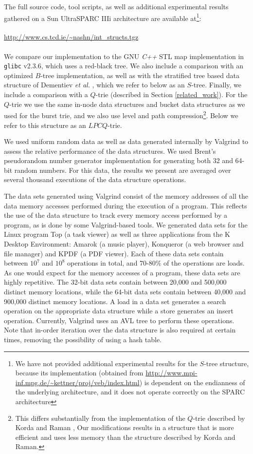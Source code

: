 \documentclass[]{acmtrans2m}
\begin{document}
The full source code, tool scripts, as well as additional experimental results
gathered on a Sun UltraSPARC IIIi architecture are available at\footnote{We have not provided additional
experimental results for the $S$-tree structure, because its implementation (obtained from
\url{http://www.mpi-inf.mpg.de/~kettner/proj/veb/index.html}) is dependent
on the endianness of the underlying architecture, and it does not operate correctly on the SPARC architecture}:\\
\\
\url{http://www.cs.tcd.ie/~nashn/int_structs.tgz}\\
\\
\noindent
We compare our implementation to the GNU \textsl{C++} STL map implementation \cite{Stroustrup97} in \texttt{glibc} v2.3.6, which uses a
red-black tree. We also include a comparison with an optimized $B$-tree implementation, as well as with the stratified tree based 
data structure of Dementiev \textit{et al.} \cite{Dementiev+04}, which we refer to below as an $S$-tree. 
Finally, we include a comparison with a $Q$-trie (described in Section \ref{related_work}). 
For the $Q$-trie we use the same in-node data structures and bucket data structures
as we used for the burst trie, and we also use level and path compression\footnote{This differs substantially from the implementation of the $Q$-trie described by Korda and Raman \cite{KordaRaman99},
Our modifications results in a structure that is more efficient and uses less memory than the structure described by Korda and Raman.}.
Below we refer to this structure as an $LPCQ$-trie.

We used uniform random data as well as data generated internally by Valgrind to assess the relative
performance of the data structures. We used Brent's \citeyear{Brent04} pseudorandom number generator implementation
for generating both 32 and 64-bit random numbers. For this data, the results we present are averaged
over several thousand executions of the data structure operations.

The data sets generated using Valgrind consist of 
the memory addresses of all the data memory accesses performed during the execution of a program. This reflects
the use of the data structure to track every memory access performed by a program, as is done by some Valgrind-based
tools. We generated data sets for
the Linux program Top (a task viewer) as well as three applications from the K Desktop Environment: Amarok (a music
player), Konqueror (a web browser and file manager) and KPDF (a PDF viewer). Each of these data sets contain between $10^7$ and
$10^8$ operations in total, and 70-80\% of the operations are loads. As one would expect for the memory accesses of a program,
these data sets are highly repetitive. The 32-bit data sets contain between 20,000 and 500,000 distinct memory locations, while
the 64-bit data sets contain between 40,000 and 900,000 distinct memory locations.
A load in a data set generates a search operation on the appropriate data structure while a store generates an insert operation.
Currently, Valgrind uses an AVL tree to perform these operations. Note that in-order iteration over the data structure is also
required at certain times, removing the possibility of using a hash table.
\end{document}

